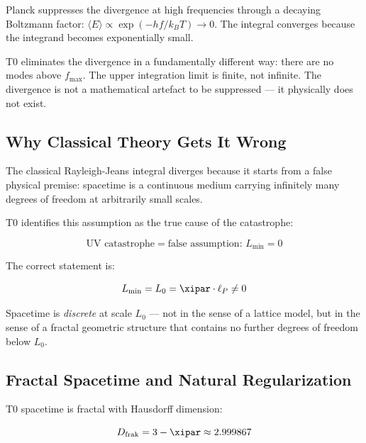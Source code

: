 \begin{important}
    Planck suppresses the divergence at high frequencies through a decaying 
    Boltzmann factor: $\langle E \rangle \propto \exp(-hf/k_BT) \to 0$. 
    The integral converges because the integrand becomes exponentially small.
    
    T0 eliminates the divergence in a fundamentally different way: there are no 
    modes above $f_{\max}$. The upper integration limit is finite, not infinite. 
    The divergence is not a mathematical artefact to be suppressed — it physically 
    does not exist.
\end{important}

\subsection{Why Classical Theory Gets It Wrong}

The classical Rayleigh-Jeans integral diverges because it starts from a false 
physical premise: spacetime is a continuous medium carrying infinitely many degrees 
of freedom at arbitrarily small scales.

T0 identifies this assumption as the true cause of the catastrophe:

\begin{equation}
    \text{UV catastrophe} = \text{false assumption: } L_{\min} = 0
\end{equation}

The correct statement is:

\begin{equation}
    L_{\min} = L_0 = \xipar \cdot \ell_P \neq 0
\end{equation}

Spacetime is \emph{discrete} at scale $L_0$ — not in the sense of a lattice model, 
but in the sense of a fractal geometric structure that contains no further degrees 
of freedom below $L_0$.

\subsection{Fractal Spacetime and Natural Regularization}

T0 spacetime is fractal with Hausdorff dimension:

\begin{equation}
    D_{\text{frak}} = 3 - \xipar \approx 2.999867
    \label{eq:fractal_dim}
\end{equation}

